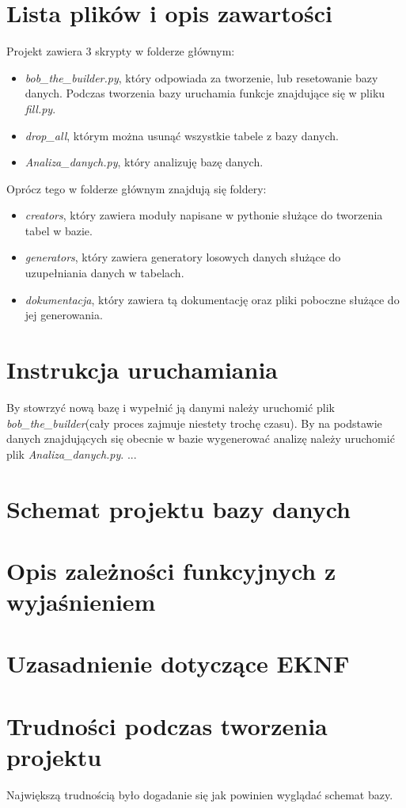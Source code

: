 \documentclass[12pt,a4paper]{article}
\begin{document}
\section{Lista plików i opis zawartości}
Projekt zawiera 3 skrypty w folderze głównym:
\begin{itemize}
\item \textit{bob\_the\_builder.py}, który odpowiada za tworzenie, lub resetowanie bazy danych. Podczas tworzenia bazy uruchamia funkcje znajdujące się w pliku \textit{fill.py}.
\item \textit{drop\_all}, którym można usunąć wszystkie tabele z bazy danych.
\item \textit{Analiza\_danych.py}, który analizuję bazę danych.
\end{itemize}
Oprócz tego w folderze głównym znajdują się foldery:
\begin{itemize}
\item \textit{creators}, który zawiera moduły napisane w pythonie służące do tworzenia tabel w bazie.
\item \textit{generators}, który zawiera generatory losowych danych służące do uzupełniania danych w tabelach.
\item \textit{dokumentacja}, który zawiera tą dokumentację oraz pliki poboczne służące do jej generowania.
\end{itemize}
\section{Instrukcja uruchamiania}
By stowrzyć nową bazę i wypełnić ją danymi należy uruchomić plik \textit{bob\_the\_builder}(cały proces zajmuje niestety trochę czasu). By na podstawie danych znajdujących się obecnie w bazie wygenerować analizę należy uruchomić plik \textit{Analiza\_danych.py}. ...

\section{Schemat projektu bazy danych}



\section{Opis zależności funkcyjnych z wyjaśnieniem}

\section{Uzasadnienie dotyczące EKNF}

\section{Trudności podczas tworzenia projektu}
Największą trudnością było dogadanie się jak powinien wyglądać schemat bazy.
\end{document}

